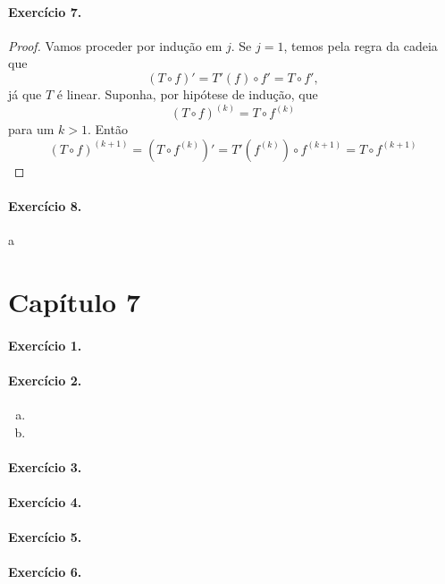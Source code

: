 \documentclass[12pt,a4paper]{article}
\begin{document}
\paragraph{Exercício 7.}
%
\begin{proof}
    Vamos proceder por indução em $j$. Se $j=1$, temos pela regra da cadeia que
    \begin{equation*}
        (T\circ f)' = T'(f)\circ f' = T\circ f',
    \end{equation*}
    já que $T$ é linear. Suponha, por hipótese de indução, que
    \begin{equation*}
        (T\circ f)^{(k)} = T\circ f^{(k)}
    \end{equation*}
    para um $k>1$. Então
    \begin{equation*}
        (T\circ f)^{(k+1)} = (T\circ f^{(k)})' = T'(f^{(k)})\circ f^{(k+1)} = T\circ f^{(k+1)}
    \end{equation*}
\end{proof}
%
\paragraph{Exercício 8.}
%
a
%
\section{Capítulo 7}

\paragraph{Exercício 1.} 
%

%
\paragraph{Exercício 2.}
%
\begin{enumerate}[a)]
    \item 
    \item
\end{enumerate}
%
\paragraph{Exercício 3.}
%

%
\paragraph{Exercício 4.} 
%

%
\paragraph{Exercício 5.} 
%

%
\paragraph{Exercício 6.}
%

%
\end{document}
